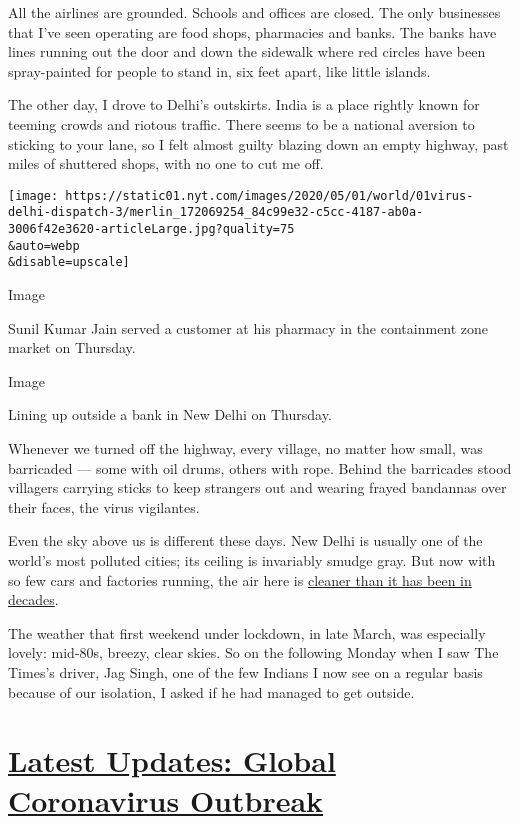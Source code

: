 All the airlines are grounded. Schools and offices are closed. The only
businesses that I've seen operating are food shops, pharmacies and
banks. The banks have lines running out the door and down the sidewalk
where red circles have been spray-painted for people to stand in, six
feet apart, like little islands.

The other day, I drove to Delhi's outskirts. India is a place rightly
known for teeming crowds and riotous traffic. There seems to be a
national aversion to sticking to your lane, so I felt almost guilty
blazing down an empty highway, past miles of shuttered shops, with no
one to cut me off.

\texttt{[image: https://static01.nyt.com/images/2020/05/01/world/01virus-delhi-dispatch-3/merlin\_172069254\_84c99e32-c5cc-4187-ab0a-3006f42e3620-articleLarge.jpg?quality=75\\\&auto=webp\\\&disable=upscale]}

Image

Sunil Kumar Jain served a customer at his pharmacy in the containment
zone market on Thursday.

Image

Lining up outside a bank in New Delhi on Thursday.

Whenever we turned off the highway, every village, no matter how small,
was barricaded --- some with oil drums, others with rope. Behind the
barricades stood villagers carrying sticks to keep strangers out and
wearing frayed bandannas over their faces, the virus vigilantes.

Even the sky above us is different these days. New Delhi is usually one
of the world's most polluted cities; its ceiling is invariably smudge
gray. But now with so few cars and factories running, the air here is
\href{https://www.nytimes.com/2020/04/08/world/asia/india-pollution-coronavirus.html}{cleaner
than it has been in decades}.

The weather that first weekend under lockdown, in late March, was
especially lovely: mid-80s, breezy, clear skies. So on the following
Monday when I saw The Times's driver, Jag Singh, one of the few Indians
I now see on a regular basis because of our isolation, I asked if he had
managed to get outside.

\hypertarget{latest-updates-global-coronavirus-outbreak}{%
\section{\texorpdfstring{\href{https://www.nytimes.com/2020/08/01/world/coronavirus-covid-19.html?action=click\&pgtype=Article\&state=default\&region=MAIN_CONTENT_1\&context=storylines_live_updates}{Latest
Updates: Global Coronavirus
Outbreak}}{Latest Updates: Global Coronavirus Outbreak}}\label{latest-updates-global-coronavirus-outbreak}}

